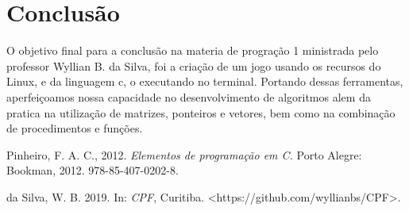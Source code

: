 \documentclass[journal]{IEEEtran}
\begin{document}
\section{Conclusão}
O objetivo final para a conclusão na materia de progração 1 ministrada pelo professor Wyllian B. da Silva, foi a criação de um jogo usando os recursos do Linux, e da linguagem c, o executando no terminal. Portando dessas ferramentas, aperfeiçoamos nossa capacidade no desenvolvimento de algoritmos alem da pratica na utilização de matrizes, ponteiros e vetores, bem como na combinação de procedimentos e funções.  


 \begin{thebibliography}{10} 
 
     Pinheiro, F. A. C., 2012. {\em Elementos de programação em C.} Porto Alegre: Bookman, 2012. 
     978-85-407-0202-8.

     da Silva, W. B. 2019. In: {\em CPF}, Curitiba. <https://github.com/wyllianbs/CPF>.
 
 \end{thebibliography}
\end{document}
